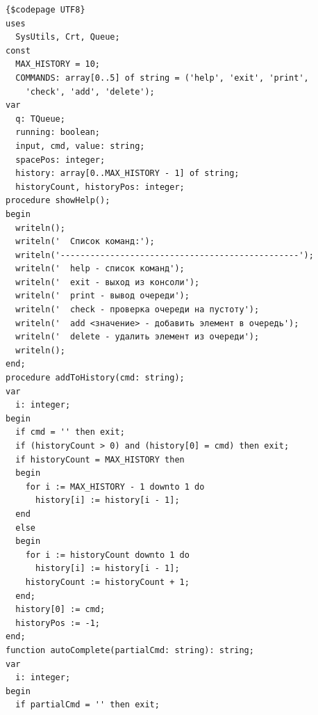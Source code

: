 \documentclass[a4paper,14pt]{extarticle}
\begin{document}
  \noindent
  \begin{Verbatim}[tabsize=4,fontsize=\small]
{$codepage UTF8}
uses
  SysUtils, Crt, Queue;
const
  MAX_HISTORY = 10;
  COMMANDS: array[0..5] of string = ('help', 'exit', 'print', 
    'check', 'add', 'delete');
var
  q: TQueue;
  running: boolean;
  input, cmd, value: string;
  spacePos: integer;
  history: array[0..MAX_HISTORY - 1] of string;
  historyCount, historyPos: integer;
procedure showHelp();
begin
  writeln();
  writeln('  Список команд:');
  writeln('------------------------------------------------');
  writeln('  help - список команд');
  writeln('  exit - выход из консоли');
  writeln('  print - вывод очереди');
  writeln('  check - проверка очереди на пустоту');
  writeln('  add <значение> - добавить элемент в очередь');
  writeln('  delete - удалить элемент из очереди');
  writeln();
end;
procedure addToHistory(cmd: string);
var
  i: integer;
begin
  if cmd = '' then exit;
  if (historyCount > 0) and (history[0] = cmd) then exit;
  if historyCount = MAX_HISTORY then
  begin
    for i := MAX_HISTORY - 1 downto 1 do
      history[i] := history[i - 1];
  end
  else
  begin
    for i := historyCount downto 1 do
      history[i] := history[i - 1];
    historyCount := historyCount + 1;
  end;
  history[0] := cmd;
  historyPos := -1;
end;
function autoComplete(partialCmd: string): string;
var
  i: integer;
begin
  if partialCmd = '' then exit;


\end{Verbatim}
\end{document}
